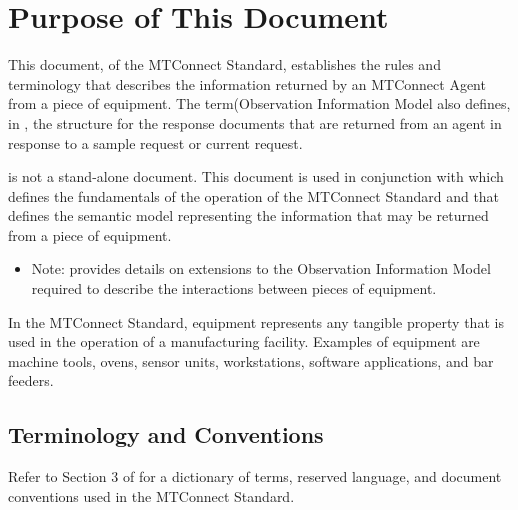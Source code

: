 
\section{Purpose of This Document}
\label{sec:Purpose of This Document}

This document,  of the MTConnect Standard, establishes the rules and terminology that describes the information returned by an \gls{MTConnect Agent} from a piece of equipment.  The {{term(Observation Information Model}} also defines, in , the structure for the \glspl{response document} that are returned from an \gls{agent} in response to a \gls{sample request} or \gls{current request}.  

 is not a stand-alone document.   This document is used in conjunction with   which defines the fundamentals of the operation of the MTConnect Standard and  that defines the semantic model representing the information that may be returned from a piece of equipment.


\begin{itemize}
    \item Note:  provides details on extensions to the \gls{Observation Information Model} required to describe the interactions between pieces of equipment.

\end{itemize}

In the MTConnect Standard, equipment represents any tangible property that is used in the operation of a manufacturing facility.  Examples of equipment are machine tools, ovens, sensor units, workstations, software applications, and bar feeders.

\subsection{Terminology and Conventions}
\label{sec:Terminology and Conventions}

Refer to Section 3 of  for a dictionary of terms, reserved language, and document conventions used in the MTConnect Standard.

\printglossary[title=General Terms, type=general]
\printglossary[title=Information Model Terms, type=informationmodel]
\printglossary[title=Protocol Terms, type=protocol]
\printglossary[title=HTTP Terms, type=http]
\printglossary[title=XML Terms, type=xml]
\printglossary[title=Concept Model Terms, type=conceptmodel]

\printacronyms

\printbibliography[title=MTConnect References,keyword=MTC]

\printbibliography[title=Other References,notkeyword=MTC]

\glsaddall